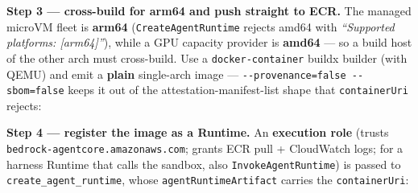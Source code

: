 \documentclass[
  paper=a4,
  ,captions=tableheading
]{scrartcl}
\newenvironment{Shaded}{}{}
\newcommand{\AttributeTok}[1]{\textcolor[rgb]{0.49,0.56,0.16}{#1}}
\newcommand{\CommentTok}[1]{\textcolor[rgb]{0.38,0.63,0.69}{\textit{#1}}}
\newcommand{\DataTypeTok}[1]{\textcolor[rgb]{0.56,0.13,0.00}{#1}}
\newcommand{\ExtensionTok}[1]{#1}
\newcommand{\NormalTok}[1]{#1}
\newcommand{\OperatorTok}[1]{\textcolor[rgb]{0.40,0.40,0.40}{#1}}
\newcommand{\VariableTok}[1]{\textcolor[rgb]{0.10,0.09,0.49}{#1}}
\begin{document}
\textbf{Step 3 --- cross-build for arm64 and push straight to ECR.} The
managed microVM fleet is \textbf{arm64} (\texttt{CreateAgentRuntime}
rejects amd64 with \emph{``Supported platforms: {[}arm64{]}''}), while a
GPU capacity provider is \textbf{amd64} --- so a build host of the other
arch must cross-build. Use a \texttt{docker-container} buildx builder
(with QEMU) and emit a \textbf{plain} single-arch image ---
\texttt{-\/-provenance=false\ -\/-sbom=false} keeps it out of the
attestation-manifest-list shape that \texttt{containerUri} rejects:

\begin{Shaded}
\end{Shaded}

\textbf{Step 4 --- register the image as a Runtime.} An
\textbf{execution role} (trusts
\texttt{bedrock-agentcore.amazonaws.com}; grants ECR pull + CloudWatch
logs; for a harness Runtime that calls the sandbox, also
\texttt{InvokeAgentRuntime}) is passed to
\texttt{create\_agent\_runtime}, whose \texttt{agentRuntimeArtifact}
carries the \texttt{containerUri}:
\end{document}
